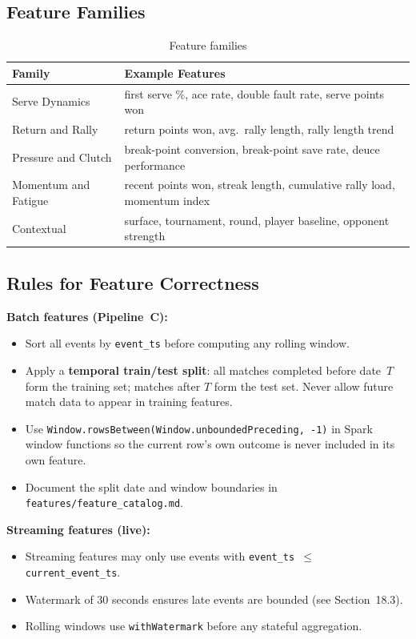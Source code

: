 \documentclass[11pt,a4paper]{article}
\begin{document}
\subsection{Feature Families}

\begin{table}[H]
\centering
\begin{tabularx}{\linewidth}{L{4cm}X}
\toprule
\textbf{Family} & \textbf{Example Features} \\
\midrule
Serve Dynamics & first serve \%, ace rate, double fault rate, serve points won \\
Return and Rally & return points won, avg.\ rally length, rally length trend \\
Pressure and Clutch & break-point conversion, break-point save rate, deuce performance \\
Momentum and Fatigue & recent points won, streak length, cumulative rally load, momentum index \\
Contextual & surface, tournament, round, player baseline, opponent strength \\
\bottomrule
\end{tabularx}
\caption{Feature families}
\end{table}

\subsection{Rules for Feature Correctness}

\begin{criticalbox}
\textbf{Batch features (Pipeline~C):}
\begin{itemize}[nosep]
  \item Sort all events by \texttt{event\_ts} before computing any rolling window.
  \item Apply a \textbf{temporal train/test split}: all matches completed before date~$T$ form
    the training set; matches after $T$ form the test set. Never allow future match data to
    appear in training features.
  \item Use \texttt{Window.rowsBetween(Window.unboundedPreceding, -1)} in Spark window
    functions so the current row's own outcome is never included in its own feature.
  \item Document the split date and window boundaries in \texttt{features/feature\_catalog.md}.
\end{itemize}

\textbf{Streaming features (live):}
\begin{itemize}[nosep]
  \item Streaming features may only use events with \texttt{event\_ts $\leq$ current\_event\_ts}.
  \item Watermark of 30 seconds ensures late events are bounded (see Section~18.3).
  \item Rolling windows use \texttt{withWatermark} before any stateful aggregation.
\end{itemize}
\end{criticalbox}
\end{document}

